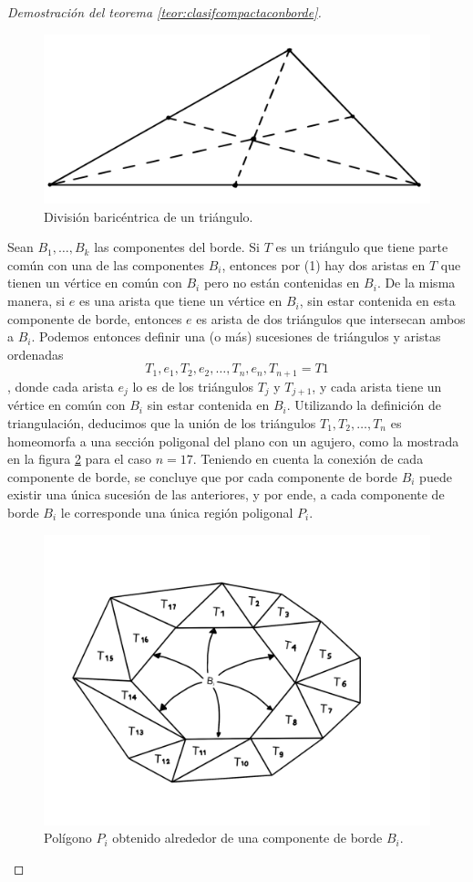 \documentclass[a4paper,11pt,spanish, twoside, leqno]{tfg-uam}
\theoremstyle{definition}
\begin{document}
\begin{proof}[Demostración del teorema \ref{teor:clasifcompactaconborde}]
\begin{figure}[h!]
	\centering
	\includegraphics[width=0.3\linewidth]{imagenes/divisionbaricentrica.png}
	\caption{División baricéntrica de un triángulo.}
    \label{imagen de division baricentrica}
\end{figure}

Sean $B_1, \ldots, B_k$ las componentes del borde. Si $T$ es un triángulo que tiene parte común con una de las componentes $B_i$, entonces por (1) hay dos aristas en $T$ que tienen un vértice en común con $B_i$ pero no están contenidas en $B_i$. De la misma manera, si $e$ es una arista que tiene un vértice en $B_i$, sin estar contenida en esta componente de borde, entonces $e$ es arista de dos triángulos que intersecan ambos a $B_i$. Podemos entonces definir una (o más) sucesiones de triángulos y aristas ordenadas
\[T_1, e_1, T_2, e_2, \ldots, T_n, e_n, T_{n+1} = T1\],
donde cada arista $e_j$ lo es de los triángulos $T_{j}$ y $T_{j+1}$, y cada arista tiene un vértice en común con $B_i$ sin estar contenida en $B_i$. Utilizando la definición de triangulación, deducimos que la unión de los triángulos $T_1, T_2, \ldots, T_n$ es homeomorfa a una sección poligonal del plano con un agujero, como la mostrada en la figura \ref{imagen de poligono de borde} para el caso $n=17$. Teniendo en cuenta la conexión de cada componente de borde, se concluye que por cada componente de borde $B_i$ puede existir una única sucesión de las anteriores, y por ende, a cada componente de borde $B_i$ le corresponde una única región poligonal $P_i$.

\begin{figure}[h!]
	\centering
	\includegraphics[width=0.5\linewidth]{imagenes/poligonodeborde.png}
	\caption{Polígono $P_i$ obtenido alrededor de una componente de borde $B_i$.}
	\label{imagen de poligono de borde}
\end{figure}


\end{proof}
\end{document}
